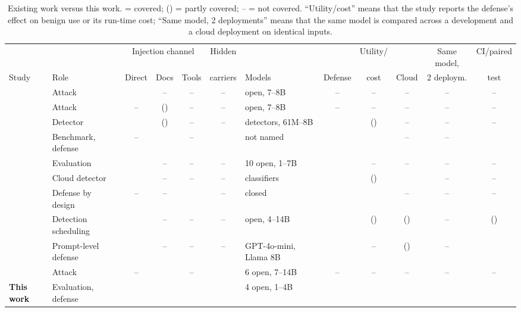 \documentclass[a4paper,fleqn]{cas-dc}
\newcommand{\yes}{\checkmark}
\newcommand{\no}{--}
\newcommand{\pt}{(\checkmark)}
\begin{document}
\begin{table}[!t]
\caption{Existing work versus this work. \yes{} = covered; \pt{} = partly covered; \no{} = not covered. ``Utility/cost'' means that the study reports the defense's effect on benign use or its run-time cost; ``Same model, 2 deployments'' means that the same model is compared across a development and a cloud deployment on identical inputs.}
\label{tab:lit}
\centering\scriptsize
\setlength{\tabcolsep}{2.6pt}
\begin{tabular}{@{}llcccclccccc@{}}
\toprule
& & \multicolumn{3}{c}{Injection channel} & Hidden & & & Utility/ & & Same model, & CI/paired \\
\cmidrule(lr){3-5}
Study & Role & Direct & Docs & Tools & carriers & Models & Defense & cost & Cloud & 2 deploym. & test \\
\midrule
\citet{P01} & Attack & \yes & \no & \no & \no & open, 7--8B & \no & \no & \no & \no & \no \\
\citet{P02} & Attack & \no & \pt & \no & \no & open, 7--8B & \no & \no & \no & \no & \no \\
\citet{P03} & Detector & \yes & \pt & \no & \no & detectors, 61M--8B & \yes & \pt & \no & \no & \no \\
\citet{P04} & Benchmark, defense & \no & \yes & \no & \yes & not named & \yes & \yes & \no & \no & \yes \\
\citet{P05} & Evaluation & \yes & \no & \no & \no & 10 open, 1--7B & \yes & \no & \no & \no & \no \\
\citet{P06} & Cloud detector & \yes & \no & \no & \no & classifiers & \yes & \pt & \yes & \no & \no \\
\citet{P08} & Defense by design & \no & \no & \yes & \no & closed & \yes & \yes & \no & \no & \no \\
\citet{P09} & Detection scheduling & \yes & \no & \no & \no & open, 4--14B & \yes & \pt & \pt & \no & \pt \\
\citet{P10} & Prompt-level defense & \yes & \no & \no & \no & GPT-4o-mini, Llama 8B & \yes & \no & \pt & \no & \yes \\
\citet{P13} & Attack & \no & \yes & \no & \yes & 6 open, 7--14B & \no & \no & \no & \no & \no \\
\midrule
\textbf{This work} & Evaluation, defense & \yes & \yes & \yes & \yes & 4 open, 1--4B & \yes & \yes & \yes & \yes & \yes \\
\bottomrule
\end{tabular}
\end{table}
\end{document}

